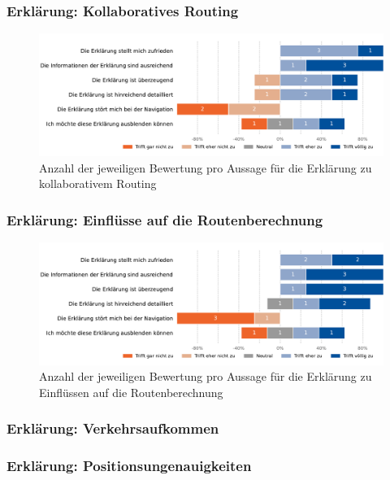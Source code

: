 \newpage

\subsubsection{Erklärung: Kollaboratives Routing}

\begin{figure}[htb!]
    \centering
    \includegraphics[width=\textwidth]{contents/06_model_evaluation/02_evaluation/res/qualitativeFeedback-01_collaborative_routing_short.pdf}
    \caption{Anzahl der jeweiligen Bewertung pro Aussage für die Erklärung zu kollaborativem Routing}
    \label{fig:01_collaborative_routing_short}
\end{figure}

\subsubsection{Erklärung: Einflüsse auf die Routenberechnung}

\begin{figure}[htb!]
    \centering
    \includegraphics[width=\textwidth]{contents/06_model_evaluation/02_evaluation/res/qualitativeFeedback-02_collaborative_algorithm_short.pdf}
    \caption{Anzahl der jeweiligen Bewertung pro Aussage für die Erklärung zu Einflüssen auf die Routenberechnung}
    \label{fig:02_collaborative_algorithm_short}
\end{figure}


\subsubsection{Erklärung: Verkehrsaufkommen}


\subsubsection{Erklärung: Positionsungenauigkeiten}
